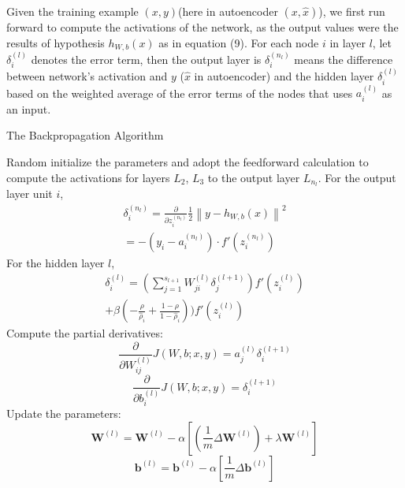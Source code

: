 \documentclass{bmcart}
\begin{document}
Given the training example $(x,y)$(here in autoencoder $(x, \hat{x})$), we first run forward to compute the activations of the network, as the output values were the results of hypothesis $h_{W, b}(x)$ as in equation (9). For each node $i$ in layer $l$, let $\delta_i^{(l)}$ denotes the error term, then the output layer is $\delta^{(n_l)}_i $ means the difference between network's activation and $y$ ($\hat{x}$ in autoencoder) and the hidden layer $\delta^{(l)}_i$ based on the weighted average of the error terms of the nodes that uses $a^{(l)}_i$ as an input.


\begin{algorithm}
\caption{The Backpropagation Algorithm}
\begin{algorithmic}[1]
\State Random initialize the parameters and adopt the feedforward calculation to compute the activations for layers $L_2$, $L_3$ to the output layer $L_{n_l}$.
\State For the output layer unit $i$,
\begin{equation}
\begin{split}
\delta^{(n_l)}_i = \frac{\partial}{\partial z^{(n_l)}_i}\frac{1}{2} \left\|y - h_{W,b}(x)\right\|^2 \\
= - (y_i - a^{(n_l)}_i) \cdot f'(z^{(n_l)}_i)
\end{split}
\end{equation} 
\State For the hidden layer $l$, 
\begin{equation}
\begin{split}
\delta^{(l)}_i = \left( \sum_{j=1}^{s_{l+1}} W^{(l)}_{ji} \delta^{(l+1)}_j \right) f'(z^{(l)}_i) \\
+ \beta( - \frac{\rho}{\hat\rho_i} + \frac{1-\rho}{1-\hat\rho_i} ) ) f'(z^{(l)}_i)           
\end{split}
\end{equation}
\State Compute the partial derivatives:
\begin{equation}
\frac{\partial}{\partial W_{ij}^{(l)}} J(W,b; x, y) = a^{(l)}_j \delta_i^{(l+1)} 
\end{equation}
\begin{equation}
\frac{\partial}{\partial b_{i}^{(l)}} J(W,b; x, y) = \delta_i^{(l+1)}
\end{equation}
\State Update the parameters:
\begin{equation}
\mathbf W^{(l)} = \mathbf W^{(l)} - \alpha [ (\frac{1}{m} \Delta \mathbf W^{(l)} ) + \lambda \mathbf W^{(l)}] 
\end{equation}
\begin{equation}
\mathbf b^{(l)} = \mathbf b^{(l)} - \alpha [\frac{1}{m} \Delta \mathbf b^{(l)}]
\end{equation}
\end{algorithmic}
\end{algorithm}
\end{document}
